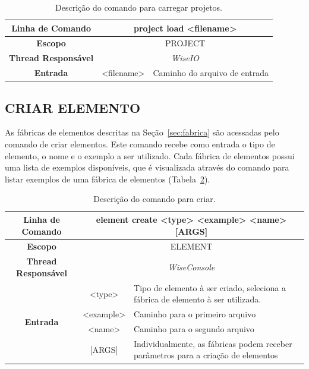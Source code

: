 \begin{center}
	\begin{table}[!htbp]
		\begin{tabularx}{\textwidth}{c|c|X}
			\toprule
			\textbf{Linha de Comando} & \multicolumn{2}{c}{project load <filename>} \\
			\midrule
			\textbf{Escopo} & \multicolumn{2}{c}{PROJECT} \\
			\hline
			\textbf{Thread Responsável} & \multicolumn{2}{c}{\textit{WiseIO}} \\
			\hline
			\textbf{Entrada} & <filename> & Caminho do arquivo de entrada \\
			\bottomrule
		\end{tabularx}
		\caption{Descrição do comando para carregar projetos.}
		\label{tab:load_project}
	\end{table}
\end{center}

\subsection{CRIAR ELEMENTO}\label{sec:create_element}

As fábricas de elementos descritas na Seção~\ref{sec:fabrica} são acessadas pelo comando de criar elementos. Este comando recebe como entrada o tipo de elemento, o nome e o exemplo a ser utilizado. Cada fábrica de elementos possui uma lista de exemplos disponíveis, que é visualizada através do comando para listar exemplos de uma fábrica de elementos (Tabela~\ref{tab:create_element}).

\begin{center}
	\begin{table}[!htbp]
		\begin{tabularx}{\textwidth}{c|c|X}
			\toprule
			\textbf{Linha de Comando} & \multicolumn{2}{c}{element create <type> <example> <name> [ARGS]} \\
			\midrule
			\textbf{Escopo} & \multicolumn{2}{c}{ELEMENT} \\
			\hline
			\textbf{Thread Responsável} & \multicolumn{2}{c}{\textit{WiseConsole}} \\
			\hline
			\multirow{4}{*}{\textbf{Entrada}} & <type> & Tipo de elemento à ser criado, seleciona a fábrica de elemento à ser utilizada. \\
			
			& <example> & Caminho para o primeiro arquivo \\
			& <name> & Caminho para o segundo arquivo \\
			& [ARGS] & Individualmente,  as fábricas podem receber parâmetros para a criação de elementos \\
			\bottomrule
		\end{tabularx}
		\caption{Descrição do comando para criar.}
		\label{tab:create_element}
	\end{table}
\end{center}

